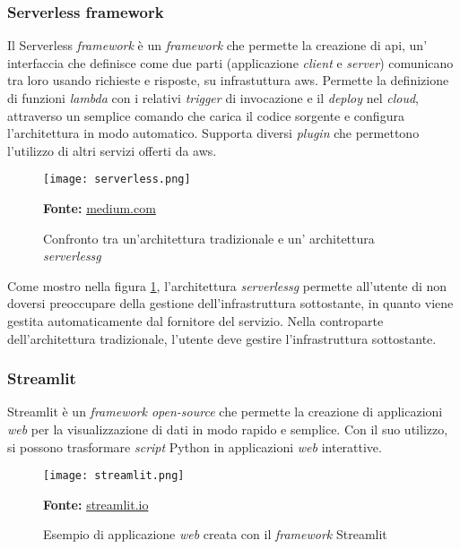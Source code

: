 \subsubsection{Serverless framework}
Il Serverless \textit{framework} è un \textit{framework} che permette la creazione di \gls{api}, un' interfaccia che definisce come due parti (applicazione \textit{client} e \textit{server}) comunicano tra loro usando richieste e risposte, su infrastuttura \gls{aws}. Permette la definizione di funzioni \textit{lambda} con i relativi \textit{trigger} di invocazione e il \textit{deploy} nel \textit{cloud}, attraverso un semplice comando che carica il codice sorgente e configura l'architettura in modo automatico. Supporta diversi \textit{plugin} che permettono l'utilizzo di altri servizi offerti da \gls{aws}.
\begin{figure}[H]
    \centering
    \texttt{[image: serverless.png]}
    \caption{Confronto tra un'architettura tradizionale e un' architettura \textit{\gls{serverlessg}}}
    \small \textbf{Fonte:} \href{https://medium.com/canonichq/server-v-s-serverless-architecture-bf3cdab28174}{medium.com}
    \label{fig:Serverless}
\end{figure} 
\noindent
Come mostro nella figura \ref{fig:Serverless}, l'architettura \textit{\gls{serverlessg}} permette all'utente di non doversi preoccupare della gestione dell'infrastruttura sottostante, in quanto viene gestita automaticamente dal fornitore del servizio. Nella controparte dell'architettura tradizionale, l'utente deve gestire l'infrastruttura sottostante.
\subsubsection{Streamlit}
Streamlit è un \textit{framework open-source} che permette la creazione di applicazioni \textit{web} per la visualizzazione di dati in modo rapido e semplice.
Con il suo utilizzo, si possono trasformare \textit{script} Python in applicazioni \textit{web} interattive.
\begin{figure}[H]
    \centering
    \texttt{[image: streamlit.png]}
    \caption{Esempio di applicazione \textit{web} creata con il \textit{framework} Streamlit}
    \small \textbf{Fonte:} \href{https://streamlit.io}{streamlit.io}
    \label{fig:Streamlit}
\end{figure} 

